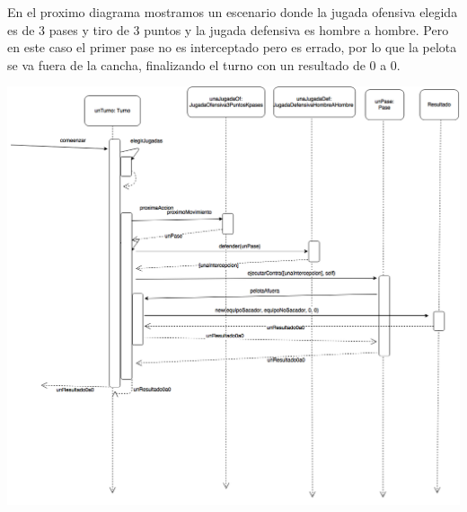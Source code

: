En el proximo diagrama mostramos un escenario donde la jugada ofensiva elegida es de 3 pases y tiro de 3 puntos y la jugada defensiva es hombre a hombre. Pero en este caso el primer pase no es interceptado pero es errado, por lo que la pelota se va fuera de la cancha, finalizando el turno con un resultado de 0 a 0.
\begin{center}
  \includegraphics[scale=0.45]{imagenes/turno-pase-afuera.png}
\end{center}
